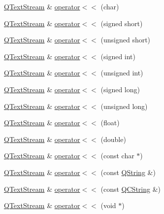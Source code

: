 \begin{DoxyCompactItemize}
\item 
\hyperlink{class_q_text_stream}{Q\-Text\-Stream} \& \hyperlink{class_q_text_stream_a29f3fda63893daa3ff7c7fbbf8b51b3e}{operator$<$$<$} (char)
\item 
\hyperlink{class_q_text_stream}{Q\-Text\-Stream} \& \hyperlink{class_q_text_stream_aff473434267fabf83d83785881a99fc7}{operator$<$$<$} (signed short)
\item 
\hyperlink{class_q_text_stream}{Q\-Text\-Stream} \& \hyperlink{class_q_text_stream_a952e36c51d1f52d7e28705cbbab02230}{operator$<$$<$} (unsigned short)
\item 
\hyperlink{class_q_text_stream}{Q\-Text\-Stream} \& \hyperlink{class_q_text_stream_a54f35a7081b48efd5ae9dc14e0eb20d5}{operator$<$$<$} (signed int)
\item 
\hyperlink{class_q_text_stream}{Q\-Text\-Stream} \& \hyperlink{class_q_text_stream_aa996f623ec0b9ab72d8bd01d7f14ff0f}{operator$<$$<$} (unsigned int)
\item 
\hyperlink{class_q_text_stream}{Q\-Text\-Stream} \& \hyperlink{class_q_text_stream_a89297462ef42a6994625dd4cabed5dd1}{operator$<$$<$} (signed long)
\item 
\hyperlink{class_q_text_stream}{Q\-Text\-Stream} \& \hyperlink{class_q_text_stream_ab1e1bbf0674bbf80931f6698a2bbeda3}{operator$<$$<$} (unsigned long)
\item 
\hyperlink{class_q_text_stream}{Q\-Text\-Stream} \& \hyperlink{class_q_text_stream_afd41ee11ab01e7fcad6acf0990464e6f}{operator$<$$<$} (float)
\item 
\hyperlink{class_q_text_stream}{Q\-Text\-Stream} \& \hyperlink{class_q_text_stream_a03dd84c234914fe959f81fa3efab7795}{operator$<$$<$} (double)
\item 
\hyperlink{class_q_text_stream}{Q\-Text\-Stream} \& \hyperlink{class_q_text_stream_a0e0ca93be765a5425fdeea6a441ce08b}{operator$<$$<$} (const char $\ast$)
\item 
\hyperlink{class_q_text_stream}{Q\-Text\-Stream} \& \hyperlink{class_q_text_stream_a10fccbdc55a7a6fd083185a07aceed13}{operator$<$$<$} (const \hyperlink{class_q_string}{Q\-String} \&)
\item 
\hyperlink{class_q_text_stream}{Q\-Text\-Stream} \& \hyperlink{class_q_text_stream_a75220702cd521be4ff964f328ac47984}{operator$<$$<$} (const \hyperlink{class_q_c_string}{Q\-C\-String} \&)
\item 
\hyperlink{class_q_text_stream}{Q\-Text\-Stream} \& \hyperlink{class_q_text_stream_a62c13dc2629b6f9366e0197d19b38cf1}{operator$<$$<$} (void $\ast$)

\end{DoxyCompactItemize}
